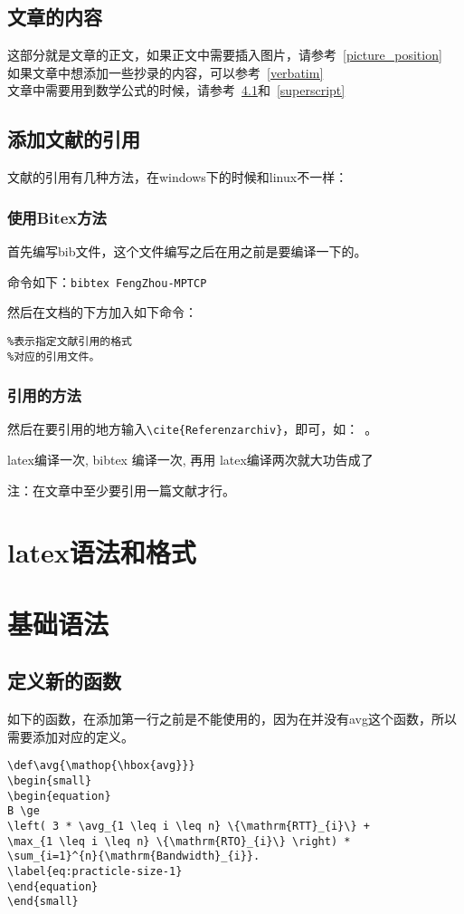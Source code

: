 \documentclass[a4paper,12pt]{ctexbook}
\begin{document}
\begin{flushleft}
\section{文章的内容}
这部分就是文章的正文，如果正文中需要插入图片，请参考~\ref{picture_position}\\
如果文章中想添加一些抄录的内容，可以参考~\ref{verbatim}\\
文章中需要用到数学公式的时候，请参考~\ref{define_function}和~\ref{superscript}

\section{添加文献的引用}
文献的引用有几种方法，在windows下的时候和linux不一样：
\subsection{使用Bitex方法}
首先编写bib文件，这个文件编写之后在用之前是要编译一下的。

命令如下：\verb|bibtex FengZhou-MPTCP|

然后在文档的下方加入如下命令：
\begin{verbatim}
%表示指定文献引用的格式
%对应的引用文件。
\end{verbatim}

\subsection{引用的方法}
然后在要引用的地方输入\verb|\cite{Referenzarchiv}|，即可，如：~\cite{LCN2002}。

latex编译一次, bibtex 编译一次, 再用 latex编译两次就大功告成了

注：在文章中至少要引用一篇文献才行。

\chapter{latex语法和格式}
\chapter{基础语法}
\section{定义新的函数}
\label{define_function}
如下的函数，在添加第一行之前是不能使用的，因为在并没有avg这个函数，所以需要添加对应的定义。
\begin{verbatim}
\def\avg{\mathop{\hbox{avg}}}
\begin{small}
\begin{equation}
B \ge
\left( 3 * \avg_{1 \leq i \leq n} \{\mathrm{RTT}_{i}\} +
\max_{1 \leq i \leq n} \{\mathrm{RTO}_{i}\} \right) *
\sum_{i=1}^{n}{\mathrm{Bandwidth}_{i}}.
\label{eq:practicle-size-1}
\end{equation}
\end{small}
\end{verbatim}


\end{flushleft}
\end{document}

